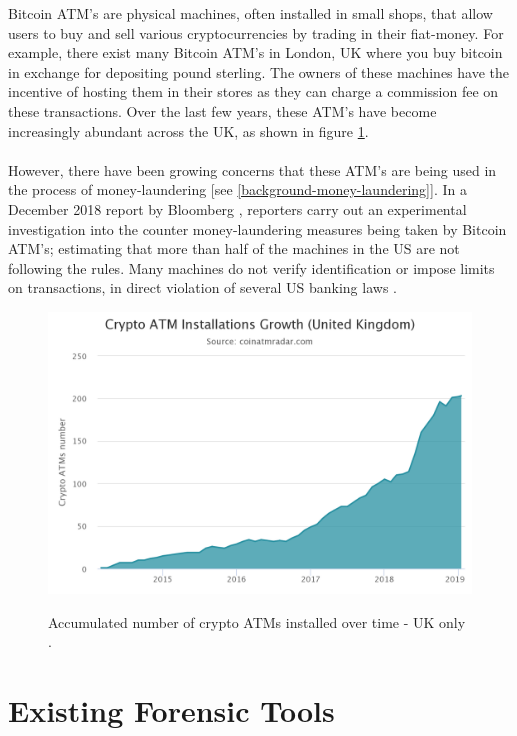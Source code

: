 Bitcoin ATM's are physical machines, often installed in small shops, that allow users to buy and sell various cryptocurrencies by trading in their \gls{fiat-money}. For example, there exist many Bitcoin ATM's in London, UK where you buy bitcoin in exchange for depositing pound sterling. The owners of these machines have the incentive of hosting them in their stores as they can charge a commission fee on these transactions. Over the last few years, these ATM's have become increasingly abundant across the UK, as shown in figure \ref{fig:background-atm-growth}. 
\\\\
However, there have been growing concerns that these ATM's are being used in the process of \gls{money-laundering} [see \ref{background-money-laundering}]. In a December 2018 report by Bloomberg \cite{RefWorks:doc:5c4af4bfe4b0686b56fa4839}, reporters carry out an experimental investigation into the counter money-laundering measures being taken by Bitcoin ATM's; estimating that more than half of the machines in the US are not following the rules. Many machines do not verify identification or impose limits on transactions, in direct violation of several US banking laws \cite{RefWorks:doc:5c4af4bfe4b0686b56fa4839}. 

\begin{figure}[h!]
  \centering
  \includegraphics[width = 15cm]{./figures/atm-installs-uk}\\[0.5cm] 
  \caption{Accumulated number of crypto ATMs installed over time - UK only \cite{RefWorks:doc:5c3f53f3e4b029cf9278c787}.}
  \label{fig:background-atm-growth}
\end{figure}


\section{Existing Forensic Tools} 

